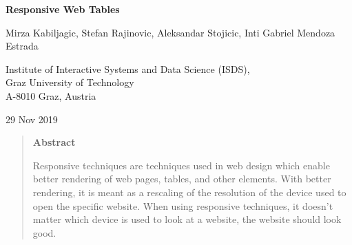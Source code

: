 \documentclass[11pt,onecolumn,twoside]{report}
\begin{document}
\unixdate

\normalsize
\pagestyle{empty}         %




\begin{titlepage}

\begin{center}
\begin{spacing}{1.1}
\Large\sffamily\bfseries
Responsive Web Tables
\end{spacing}

\vspace{1cm}

{\large\sffamily Mirza Kabiljagic, Stefan Rajinovic, Aleksandar Stojicic, Inti Gabriel Mendoza Estrada}


\vspace{1cm}

Institute of Interactive Systems and Data Science (ISDS), \\
Graz University of Technology \\
A-8010 Graz, Austria \\[1cm]



\vspace{1cm}

{29 Nov 2019}

\end{center}



\vspace{2cm}

\begin{quote}
\begin{center}
{\large\sffamily\bfseries Abstract}
\end{center}
Responsive techniques are techniques used in web design which enable better rendering of web pages, tables, and other elements. With better rendering, it is meant as a rescaling of the resolution of the device used to open the specific website. When using responsive techniques, it doesn't matter which device is used to look at a website, the website should look good. 



\end{quote}
\end{titlepage}
\end{document}
